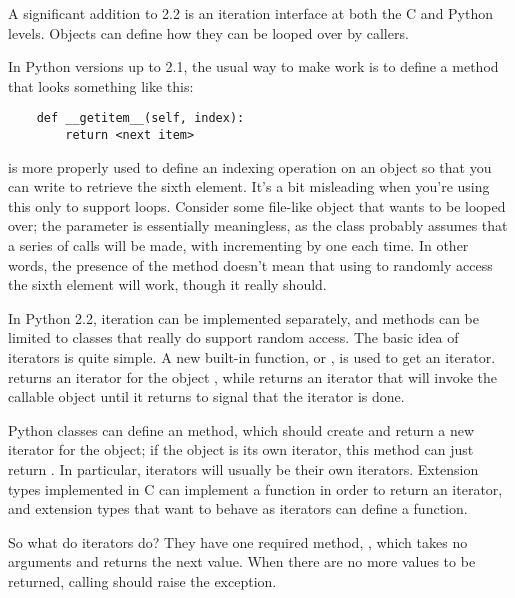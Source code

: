 \documentclass{howto}
\begin{document}
A significant addition to 2.2 is an iteration interface at both the C
and Python levels.  Objects can define how they can be looped over by
callers.

In Python versions up to 2.1, the usual way to make  work is to define a  method that looks
something like this:

\begin{verbatim}
    def __getitem__(self, index):
        return <next item>
\end{verbatim}

 is more properly used to define an indexing
operation on an object so that you can write  to retrieve
the sixth element.  It's a bit misleading when you're using this only
to support  loops.  Consider some file-like object that
wants to be looped over; the  parameter is essentially
meaningless, as the class probably assumes that a series of
 calls will be made, with 
incrementing by one each time.  In other words, the presence of the
 method doesn't mean that using  
to randomly access the sixth element will work, though it really should.

In Python 2.2, iteration can be implemented separately, and
 methods can be limited to classes that really
do support random access.  The basic idea of iterators is quite
simple.  A new built-in function,  or
, is used to get an iterator.
 returns an iterator for the object ,
while  returns an iterator that
will invoke the callable object  until it returns
 to signal that the iterator is done.  

Python classes can define an  method, which should
create and return a new iterator for the object; if the object is its
own iterator, this method can just return .  In particular,
iterators will usually be their own iterators.  Extension types
implemented in C can implement a  function in order to
return an iterator, and extension types that want to behave as
iterators can define a  function.

So what do iterators do?  They have one required method,
, which takes no arguments and returns the next value.
When there are no more values to be returned, calling 
should raise the  exception.
\end{document}
